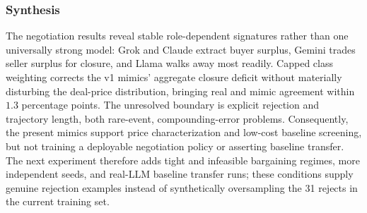 \subsubsection{Synthesis}

The negotiation results reveal stable role-dependent signatures rather than one universally strong model: Grok and Claude extract buyer surplus, Gemini trades seller surplus for closure, and Llama walks away most readily. Capped class weighting corrects the v1 mimics' aggregate closure deficit without materially disturbing the deal-price distribution, bringing real and mimic agreement within $1.3$ percentage points. The unresolved boundary is explicit rejection and trajectory length, both rare-event, compounding-error problems. Consequently, the present mimics support price characterization and low-cost baseline screening, but not training a deployable negotiation policy or asserting baseline transfer. The next experiment therefore adds tight and infeasible bargaining regimes, more independent seeds, and real-LLM baseline transfer runs; these conditions supply genuine rejection examples instead of synthetically oversampling the 31 rejects in the current training set.
